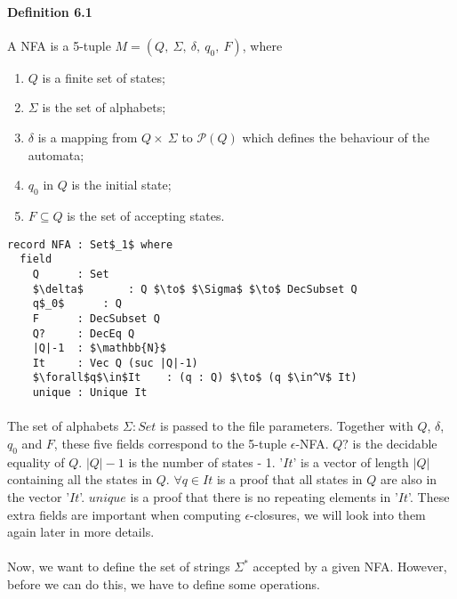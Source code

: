 \paragraph{Definition 6.1} A NFA is a 5-tuple \(M = (Q
,\ \Sigma,\ \delta,\ q_0,\ F)\), where
\begin{enumerate}[nolistsep]
  \item \(Q\) is a finite set of states;
  \item \(\Sigma\) is the set of alphabets;
  \item \(\delta\) is a mapping from \(Q \times\ \Sigma\) to
    \(\mathcal P \left({Q}\right)\) which defines the behaviour of the automata;
  \item \(q_0\) in \(Q\) is the initial state;
  \item \(F \subseteq Q\) is the set of accepting states. 
\end{enumerate}
\vspace{0.7pc}
\begin{lstlisting}[caption=NFA,mathescape=true]
record NFA : Set$_1$ where
  field
    Q      : Set
    $\delta$       : Q $\to$ $\Sigma$ $\to$ DecSubset Q
    q$_0$      : Q
    F      : DecSubset Q
    Q?     : DecEq Q
    |Q|-1  : $\mathbb{N}$
    It     : Vec Q (suc |Q|-1)
    $\forall$q$\in$It    : (q : Q) $\to$ (q $\in^V$ It)
    unique : Unique It
\end{lstlisting}
\paragraph{} The set of alphabets \(\Sigma : Set\) is passed to the file
parameters. Together with \(Q\), \(\delta\),
\(q_0\) and \(F\), these five fields correspond to the 5-tuple
\(\epsilon\)-NFA. \(Q?\) is
the decidable equality of \(Q\). \(|Q|-1\) is the number of states -
1. '\(It\)' is a vector of length \(|Q|\) containing all the
states in \(Q\). \(\forall q\in It\) is a
proof that all states in \(Q\) are also in the vector
'\(It\)'. \(unique\) is a proof that there is no repeating elements in
'\(It\)'. These extra fields are important when computing
\(\epsilon\)-closures, we will look into them again later in more
details.  

\paragraph{} Now, we want to define the set of strings \(\Sigma^*\) accepted by a given
NFA. However, before we can do this, we have to define
some operations.

